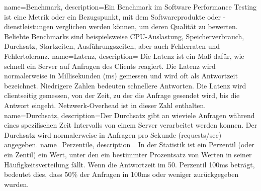 {
  name=Benchmark,
  description={Ein Benchmark im Software Performance Testing ist
      eine Metrik oder ein Bezugspunkt, mit dem Softwareprodukte oder -dienstleistungen verglichen werden können, um deren Qualität zu bewerten.
      Beliebte Benchmarks sind beispielsweise CPU-Auslastung, Speicherverbrauch, Durchsatz, Startzeiten, Ausführungszeiten,
      aber auch Fehlerraten und Fehlertoleranz.
    }
}
{
  name=Latenz,
  description={
      Die Latenz ist ein Maß dafür, wie schnell ein Server auf Anfragen des Clients reagiert.
      Die Latenz wird normalerweise in Millisekunden (ms) gemessen und wird oft als Antwortzeit bezeichnet.
      Niedrigere Zahlen bedeuten schnellere Antworten. Die Latenz wird clientseitig gemessen, von der
      Zeit, zu der die Anfrage gesendet wird, bis die Antwort eingeht. Netzwerk-Overhead ist in dieser Zahl enthalten.}
}
{
  name=Durchsatz,
  description={Der Durchsatz gibt an wieviele Anfragen während eines spezifischen Zeit Intervalls von einem Server verarbeitet werden konnen.
      Der Durchsatz wird normalerweise in Anfragen pro Sekunde (requests/sec) angegeben.}
}
{
  name=Perzentile,
  description=
    {In der Statistik ist ein Perzentil (oder ein Zentil) ein Wert, unter den ein bestimmter Prozentsatz von Werten in seiner Häufigkeitsverteilung fällt.
      Wenn die Antwortzeit im 50. Perzentil 100ms beträgt, bedeutet dies, dass 50\% der Anfragen in 100ms oder weniger zurückgegeben wurden.
    }
}
